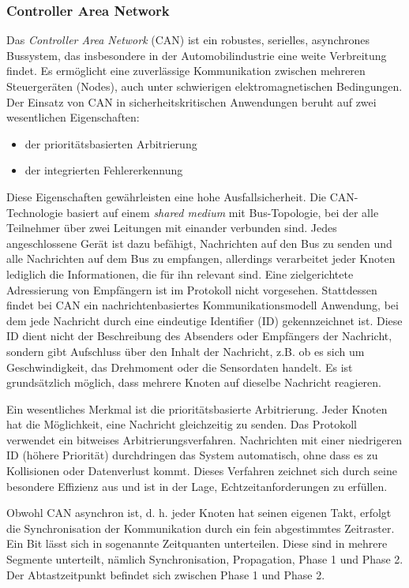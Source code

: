 \subsubsection*{Controller Area Network}
Das \emph{Controller Area Network} (CAN) ist ein robustes, serielles, asynchrones Bussystem, das insbesondere in der Automobilindustrie eine weite Verbreitung findet. 
Es ermöglicht eine zuverlässige Kommunikation zwischen mehreren Steuergeräten (Nodes), auch unter schwierigen elektromagnetischen Bedingungen. 
Der Einsatz von CAN in sicherheitskritischen Anwendungen beruht auf zwei wesentlichen Eigenschaften: 
\begin{itemize}
	\item der prioritätsbasierten Arbitrierung
	\item der integrierten Fehlererkennung
\end{itemize}
 
Diese Eigenschaften gewährleisten eine hohe Ausfallsicherheit.
Die CAN-Technologie basiert auf einem \emph{shared medium} mit Bus-Topologie, bei der alle Teilnehmer über zwei Leitungen mit einander verbunden sind.
Jedes angeschlossene Gerät ist dazu befähigt, Nachrichten auf den Bus zu senden und alle Nachrichten auf dem Bus zu empfangen, allerdings verarbeitet jeder Knoten lediglich die Informationen, die für ihn relevant sind. 
Eine zielgerichtete Adressierung von Empfängern ist im Protokoll nicht vorgesehen.
Stattdessen findet bei CAN ein nachrichtenbasiertes Kommunikationsmodell Anwendung, bei dem jede Nachricht durch eine eindeutige Identifier (ID) gekennzeichnet ist. 
Diese ID dient nicht der Beschreibung des Absenders oder Empfängers der Nachricht, sondern gibt Aufschluss über den Inhalt der Nachricht, z.B. ob es sich um Geschwindigkeit, das Drehmoment oder die Sensordaten handelt.
Es ist grundsätzlich möglich, dass mehrere Knoten auf dieselbe Nachricht reagieren.

Ein wesentliches Merkmal ist die prioritätsbasierte Arbitrierung. 
Jeder Knoten hat die Möglichkeit, eine Nachricht gleichzeitig zu senden. 
Das Protokoll verwendet ein bitweises Arbitrierungsverfahren. 
Nachrichten mit einer niedrigeren ID (höhere Priorität) durchdringen das System automatisch, ohne dass es zu Kollisionen oder Datenverlust kommt.
Dieses Verfahren zeichnet sich durch seine besondere Effizienz aus und ist in der Lage, Echtzeitanforderungen zu erfüllen.

Obwohl CAN asynchron ist, d. h. jeder Knoten hat seinen eigenen Takt, erfolgt die Synchronisation der Kommunikation durch ein fein abgestimmtes Zeitraster.
Ein Bit lässt sich in sogenannte Zeitquanten unterteilen. 
Diese sind in mehrere Segmente unterteilt, nämlich Synchronisation, Propagation, Phase 1 und Phase 2. 
Der Abtastzeitpunkt befindet sich zwischen Phase 1 und Phase 2.



